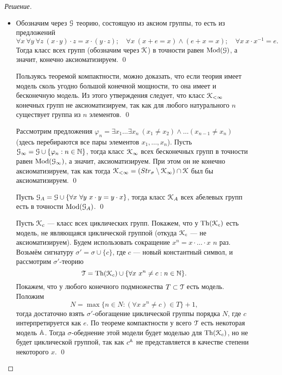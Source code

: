     \begin{proof}[Решение]
        \begin{itemize}
            \item Обозначим через \(\mathcal{G}\) теорию, состоящую из аксиом группы, то есть из предложений \[
                \forall x \ \forall y \ \forall z \ (x \cdot y) \cdot z = x \cdot (y \cdot z); \quad \forall x \ (x + e = x) \land (e + x = x); \quad \forall x \ x \cdot x^{-1} = e. 
            \]
            Тогда класс всех групп (обозначим через \(\mathcal{K}\)) в точности равен  \(\operatorname{Mod}(\mathcal{G})\), а значит, конечно аксиоматизируем. \qed

            Пользуясь теоремой компактности, можно доказать, что если теория имеет модель сколь угодно большой конечной мощности, то она имеет и бесконечную модель. Из этого утверждения следует, что класс \(\mathcal{K}_{<\infty}\) конечных групп не аксиоматизируем, так как для любого натурального \(n\) существует группа из \(n\) элементов. \qed

            Рассмотрим предложения \(\varphi_n = \exists x_1 \ldots \exists x_n \ (x_1 \neq x_2) \land \ldots (x_{n-1} \neq x_n)\) (здесь перебираются все пары элементов \(x_1, \ldots, x_n\)). Пусть \(\mathcal{G}_{\infty} = \mathcal{G} \cup \{\varphi_n : n \in \mathbb{N}\}\), тогда класс \(\mathcal{K}_{\infty}\) всех бесконечных групп в точности равен \(\operatorname{Mod}(\mathcal{G}_{\infty})\), а значит, аксиоматизируем. При этом он не конечно аксиоматизируем, так как тогда \(\mathcal{K}_{<\infty} = (Str_\sigma \setminus \mathcal{K}_{\infty}) \cap \mathcal{K}\) был бы аксиоматизируем. \qed

            Пусть \(\cG_A = \cG \cup \{\forall x \ \forall y \ x \cdot y = y \cdot x\}\), тогда класс \(\mathcal{K}_A\) всех абелевых групп есть в точности \(\operatorname{Mod}(\mathcal{G}_A)\). \qed

            Пусть \(\mathcal{K}_c\) --- класс всех циклических групп. Покажем, что у \(\operatorname{Th}(\mathcal{K}_c)\) есть модель, не являющаяся циклической группой (откуда \(\mathcal{K}_c\) --- не аксиоматизируем). Будем использовать сокращение \(x^n = x \cdot \ldots \cdot x\) \(n\) раз. Возьмём сигнатуру \(\sigma' = \sigma \cup \{c\}\), где \(c\) --- новый константный символ, и рассмотрим \(\sigma'\)-теорию \[
                \mathcal{T} = \operatorname{Th}(\mathcal{K}_c) \cup \{\forall x \ x^n \neq c : n \in \mathbb{N}\}.
            \]
            Покажем, что у любого конечного подмножества \(T \subset \mathcal{T}\) есть модель. Положим \[
                N = \max \{n \in N : (\forall x \ x^n \neq c) \in T\} + 1,
            \]
            тогда достаточно взять \(\sigma'\)-обогащение циклической группы порядка \(N\), где \(c\) интерпретируется как \(e\). По теореме компактности у всего \(\mathcal{T}\) есть некоторая модель \(\mathbb{A}\). Тогда \(\sigma\)-обеднение этой модели будет моделью для \(\operatorname{Th}(\mathcal{K}_c)\), но не будет циклической группой, так как \(c^{\mathbb{A}}\) не представляется в качестве степени некоторого \(x\). \qed


\end{itemize}
\end{proof}
